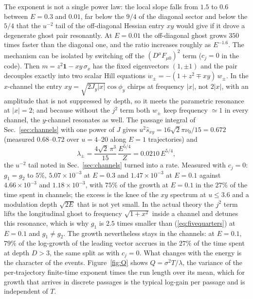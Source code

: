 The exponent is not a single power law: the local slope falls from $1.5$ to $0.6$ between
$E=0.3$ and $0.01$, far below the $9/4$ of the diagonal sector and below the $5/4$ that the
$u^{-2}$ tail of the off-diagonal Hessian entry $xy$ would give if it drove a degenerate ghost
pair resonantly. At $E=0.01$ the off-diagonal ghost grows $350$ times faster than the diagonal
one, and the ratio increases roughly as $E^{-1.6}$.
%
The mechanism can be isolated by switching off the $(D^\mu F_{\mu0})^2$ term ($c_j=0$ in the
code). Then $m=z^2\mathbf 1-xy\,\sigma_x$ has the fixed eigenvectors $(1,\pm1)$ and the pair
decouples exactly into two scalar Hill equations $\ddot w_\pm=-(1+z^2\mp xy)\,w_\pm$. In the
$x$-channel the entry $xy=\sqrt{2J_y|x|}\cos\phi_y$ chirps at frequency $|x|$, not $2|x|$, with an
amplitude that is not suppressed by depth, so it meets the parametric resonance at $|x|=2$; and
because without the $j^2$ term both $w_\pm$ keep frequency $\simeq1$ in every channel, the
$y$-channel resonates as well. The passage integral of Sec.~\ref{sec:channels} with one power of
$J$ gives $u^2\hat s_{xy}=16\sqrt2\pi\nu_0/15=0.672$ (measured $0.68$--$0.72$ over $u=4$--$20$
along $E=1$ trajectories) and
\begin{equation}
\lambda_\pm=\frac{4\sqrt2\,\pi^3}{15}\,\frac{E^{5/4}}{Z}=0.0210\,E^{5/4},
\label{eq:fivequarters}
\end{equation}
the $u^{-2}$ tail noted in Sec.~\ref{sec:channels} turned into a rate. Measured with $c_j=0$:
$g_1=g_2$ to $5\%$, $5.07\times10^{-3}$ at $E=0.3$ and $1.47\times10^{-3}$ at $E=0.1$ against
$4.66\times10^{-3}$ and $1.18\times10^{-3}$, with $75\%$ of the growth at $E=0.1$ in the $27\%$
of the time spent in channels; the excess is the knee of the $xy$ spectrum at $u\le3.6$ and a
modulation depth $\sqrt{2E}$ that is not yet small. In the actual theory the $j^2$ term lifts the longitudinal ghost to frequency $\sqrt{1+x^2}$
inside a channel and detunes this resonance, which is why $g_1$ is $2.5$ times smaller than
(\ref{eq:fivequarters}) at $E=0.1$ and $g_1\ne g_2$. The growth nevertheless stays in the
channels: at $E=0.1$, $79\%$ of the log-growth of the leading vector accrues in the $27\%$ of the
time spent at depth $D>3$, the same split as with $c_j=0$. What changes with the energy is the
character of the events. Figure~\ref{fig:Q} shows $Q=\sigma^2T/\lambda$, the variance of the
per-trajectory finite-time exponent times the run length over its mean, which for growth that
arrives in discrete passages is the typical log-gain per passage and is independent of $T$.
